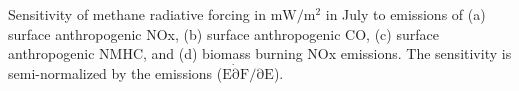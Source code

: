 Sensitivity of methane radiative forcing in $\mathrm{mW/m^2}$ in July to emissions of (a) surface anthropogenic NOx, (b) surface anthropogenic CO, (c) surface anthropogenic NMHC, and (d) biomass burning NOx emissions. The sensitivity is semi-normalized by the emissions ($\mathrm{E \dot \partial F/\partial E}$). \label{fig:rfsens}